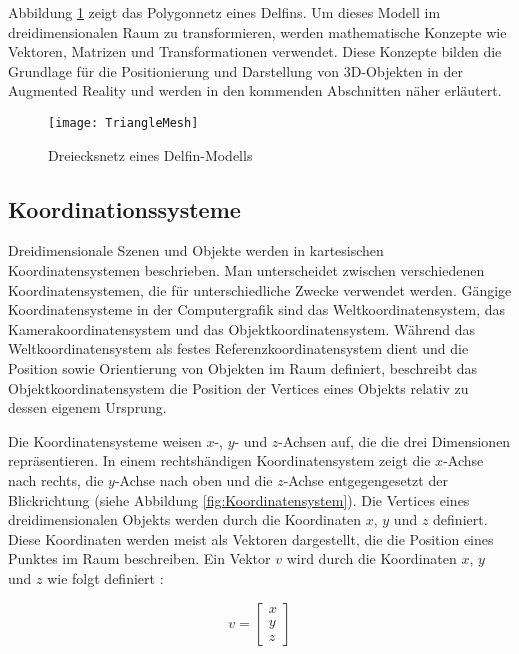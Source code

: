 Abbildung \ref{fig:TriangleMesh} zeigt das Polygonnetz eines Delfins. Um dieses Modell im dreidimensionalen Raum zu transformieren, werden mathematische Konzepte wie Vektoren, Matrizen und Transformationen verwendet. Diese Konzepte bilden die Grundlage für die Positionierung und Darstellung von 3D-Objekten in der Augmented Reality und werden in den kommenden Abschnitten näher erläutert. \cite{wikipedia2023mesh, espinoza2024graphics}

\begin{figure}
    \centering
    \texttt{[image: TriangleMesh]}
    \caption{Dreiecksnetz eines Delfin-Modells \cite{wikipedia2023mesh}\label{fig:TriangleMesh}}\par
\end{figure}

\subsection{Koordinationssysteme}

Dreidimensionale Szenen und Objekte werden in kartesischen Koordinatensystemen beschrieben. Man unterscheidet zwischen verschiedenen Koordinatensystemen, die für unterschiedliche Zwecke verwendet werden. Gängige Koordinatensysteme in der Computergrafik sind das Weltkoordinatensystem, das Kamerakoordinatensystem und das Objektkoordinatensystem. Während das Weltkoordinatensystem als festes Referenzkoordinatensystem dient und die Position sowie Orientierung von Objekten im Raum definiert, beschreibt das Objektkoordinatensystem die Position der Vertices eines Objekts relativ zu dessen eigenem Ursprung. \cite{doerner2022virtual, gao2021vSLAM, usau2023appleARCamera}

Die Koordinatensysteme weisen \(x\)-, \(y\)- und \(z\)-Achsen auf, die die drei Dimensionen repräsentieren. In einem rechtshändigen Koordinatensystem zeigt die \(x\)-Achse nach rechts, die \(y\)-Achse nach oben und die \(z\)-Achse entgegengesetzt der Blickrichtung (siehe Abbildung \ref{fig:Koordinatensystem}). Die Vertices eines dreidimensionalen Objekts werden durch die Koordinaten \(x\), \(y\) und \(z\) definiert. Diese Koordinaten werden meist als Vektoren dargestellt, die die Position eines Punktes im Raum beschreiben. Ein Vektor \(v\) wird durch die Koordinaten \(x\), \(y\) und \(z\) wie folgt definiert \cite{doerner2022virtual, gao2021vSLAM, freescale2010math3d, pezzi2021matrices}:

\begin{equation}
v = \begin{bmatrix} x \\ y \\ z \end{bmatrix}
\end{equation}

